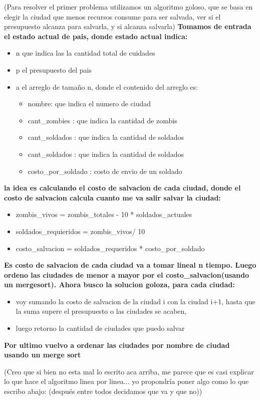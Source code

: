 (Para resolver el primer problema utilizamos un algoritmo goloso, que se basa en elegir la ciudad que menos recursos consume para ser salvada, ver si el presupuesto alcanza para salvarla, y si alcanza salvarla)
\textbf{
Tomamos de entrada el estado actual de pais, donde estado actual indica:
}
\begin{itemize}
   \item  n que indica las la cantidad total de cuidades 
   \item p el presupuesto del pais  
   \item a el arreglo de tamaño n, donde el contenido del arreglo es:
   \begin{itemize}
		\item nombre: que indica el numero de ciudad
		\item cant_zombies : que indica la cantidad de zombis
		\item cant_soldados : que indica la cantidad de soldados
		\item cant_soldados : que indica la cantidad de soldados
		\item costo_por_soldado : costo de envio de un soldado
   \end{itemize}  
\end{itemize}
\textbf{
la idea es calculando el costo de salvacion de cada ciudad, donde el costo de salvacion calcula 
cuanto me va salir salvar la ciudad:   
}
\begin{itemize}
   \item  zombis_vivos = zombis_totales - 10 * soldados_actuales
   \item  soldados_requieridos = zombis_vivos/ 10
   \item costo_salvacion = soldados_requeridos * costo_por_soldado  
\end{itemize}
\textbf{
Es costo de salvacion de cada ciudad va a tomar lineal n tiempo. Luego ordeno las ciudades de menor a mayor
por el costo_salvacion(usando un mergesort). Ahora busco la solucion goloza, para cada ciudad:
}
\begin{itemize}
	\item voy sumando la costo de salvacion de la ciudad i con la ciudad i+1, hasta que la suma 
	supere el presupuesto o las ciudades se acaben, 
	\item luego retorno la cantidad de ciudades que puedo salvar
\end{itemize}
\textbf{
Por ultimo vuelvo a ordenar las ciudades por nombre de ciudad usando un merge sort 
}

(Creo que si bien no esta mal lo escrito aca arriba, me parece que es casi explicar lo que hace el algoritmo linea por linea... yo propondría poner algo como lo que escribo abajo: (después entre todos decidamos que va y que no))

